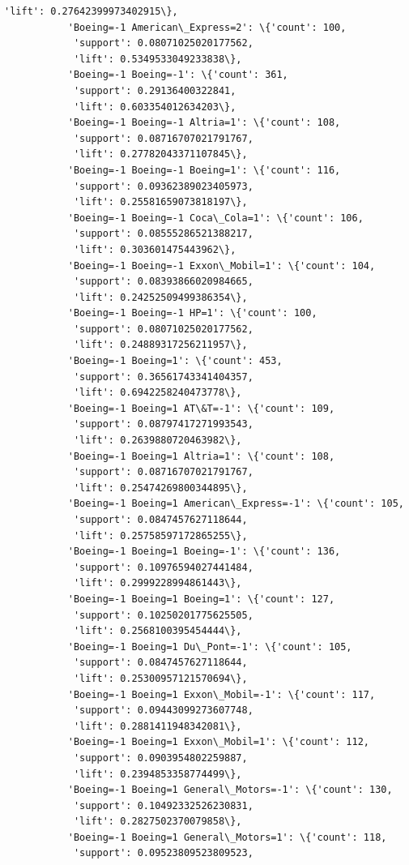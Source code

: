 \documentclass[11pt]{article}
\begin{document}
\begin{Verbatim}[commandchars=\\\{\}]
            'lift': 0.27642399973402915\},
           'Boeing=-1 American\_Express=2': \{'count': 100,
            'support': 0.08071025020177562,
            'lift': 0.5349533049233838\},
           'Boeing=-1 Boeing=-1': \{'count': 361,
            'support': 0.29136400322841,
            'lift': 0.603354012634203\},
           'Boeing=-1 Boeing=-1 Altria=1': \{'count': 108,
            'support': 0.08716707021791767,
            'lift': 0.27782043371107845\},
           'Boeing=-1 Boeing=-1 Boeing=1': \{'count': 116,
            'support': 0.09362389023405973,
            'lift': 0.25581659073818197\},
           'Boeing=-1 Boeing=-1 Coca\_Cola=1': \{'count': 106,
            'support': 0.08555286521388217,
            'lift': 0.303601475443962\},
           'Boeing=-1 Boeing=-1 Exxon\_Mobil=1': \{'count': 104,
            'support': 0.08393866020984665,
            'lift': 0.24252509499386354\},
           'Boeing=-1 Boeing=-1 HP=1': \{'count': 100,
            'support': 0.08071025020177562,
            'lift': 0.24889317256211957\},
           'Boeing=-1 Boeing=1': \{'count': 453,
            'support': 0.36561743341404357,
            'lift': 0.6942258240473778\},
           'Boeing=-1 Boeing=1 AT\&T=-1': \{'count': 109,
            'support': 0.08797417271993543,
            'lift': 0.2639880720463982\},
           'Boeing=-1 Boeing=1 Altria=1': \{'count': 108,
            'support': 0.08716707021791767,
            'lift': 0.25474269800344895\},
           'Boeing=-1 Boeing=1 American\_Express=-1': \{'count': 105,
            'support': 0.0847457627118644,
            'lift': 0.25758597172865255\},
           'Boeing=-1 Boeing=1 Boeing=-1': \{'count': 136,
            'support': 0.10976594027441484,
            'lift': 0.2999228994861443\},
           'Boeing=-1 Boeing=1 Boeing=1': \{'count': 127,
            'support': 0.10250201775625505,
            'lift': 0.2568100395454444\},
           'Boeing=-1 Boeing=1 Du\_Pont=-1': \{'count': 105,
            'support': 0.0847457627118644,
            'lift': 0.25300957121570694\},
           'Boeing=-1 Boeing=1 Exxon\_Mobil=-1': \{'count': 117,
            'support': 0.09443099273607748,
            'lift': 0.2881411948342081\},
           'Boeing=-1 Boeing=1 Exxon\_Mobil=1': \{'count': 112,
            'support': 0.0903954802259887,
            'lift': 0.2394853358774499\},
           'Boeing=-1 Boeing=1 General\_Motors=-1': \{'count': 130,
            'support': 0.10492332526230831,
            'lift': 0.2827502370079858\},
           'Boeing=-1 Boeing=1 General\_Motors=1': \{'count': 118,
            'support': 0.09523809523809523,

\end{Verbatim}
\end{document}
